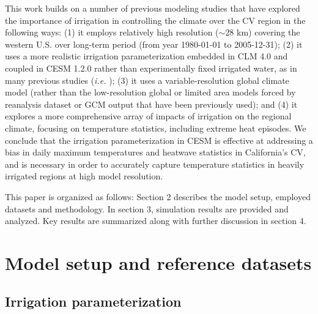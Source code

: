This work builds on a number of previous modeling studies that have explored the importance of irrigation in controlling the climate over the CV region in the following ways: (1) it employs relatively high resolution ($\sim$28 km) covering the western U.S. over long-term period  (from year 1980-01-01 to 2005-12-31); (2) it uses a more realistic irrigation parameterization embedded in CLM 4.0 and coupled in CESM 1.2.0 rather than experimentally fixed irrigated water, as in many previous studies (\textit{i.e.} \cite{lobell2006biogeophysical, lo2013irrigation}); (3) it uses a variable-resolution global climate model (rather than the low-resolution global or limited area models forced by reanalysis dataset or GCM output that have been previously used); and (4) it explores a more comprehensive array of impacts of irrigation on the regional climate, focusing on temperature statistics, including extreme heat episodes.  We conclude that the irrigation parameterization in CESM is effective at addressing a bias in daily maximum temperatures and heatwave statistics in California's CV, and is necessary in order to accurately capture temperature statistics in heavily irrigated regions at high model resolution.

This paper is organized as follows: Section 2 describes the model setup, employed datasets and methodology. In section 3, simulation results are provided and analyzed. Key results are summarized along with further discussion in section 4.

\section{Model setup and reference datasets}

\subsection{Irrigation parameterization}

